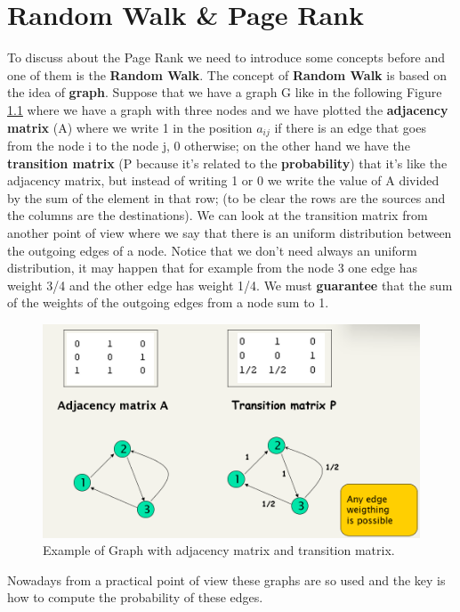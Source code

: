 \chapter{Random Walk \& Page Rank}
To discuss about the Page Rank we need to introduce some concepts before and one of them is the \textbf{Random Walk}.\newline
The concept of \textbf{Random Walk} is based on the idea of \textbf{graph}.\newline
Suppose that we have a graph G like in the following Figure \ref{fig:graph} where we have a graph with three nodes and we have plotted the \textbf{adjacency matrix} (A) where we write 1 in the position $a_{ij}$ if there is an edge that goes from the node i to the node j, 0 otherwise; on the other hand we have the \textbf{transition matrix} (P because it's related to the \textbf{probability}) that it's like the adjacency matrix, but instead of writing 1 or 0 we write the value of A divided by the sum of the element in that row; (to be clear the rows are the sources and the columns are the destinations). We can look at the transition matrix from another point of view where we say that there is an uniform distribution between the outgoing edges of a node. Notice that we don't need always an uniform distribution, it may happen that for example from the node 3 one edge has weight 3/4 and the other edge has weight 1/4. We must \textbf{guarantee} that the sum of the weights of the outgoing edges from a node sum to 1.\newline
\begin{figure}
    \centering
    \includegraphics[width=\linewidth]{images/graph.png}
    \caption{Example of Graph with adjacency matrix and transition matrix.}
    \label{fig:graph}
\end{figure}
Nowadays from a practical point of view these graphs are so used and the key is how to compute the probability of these edges.\newline
